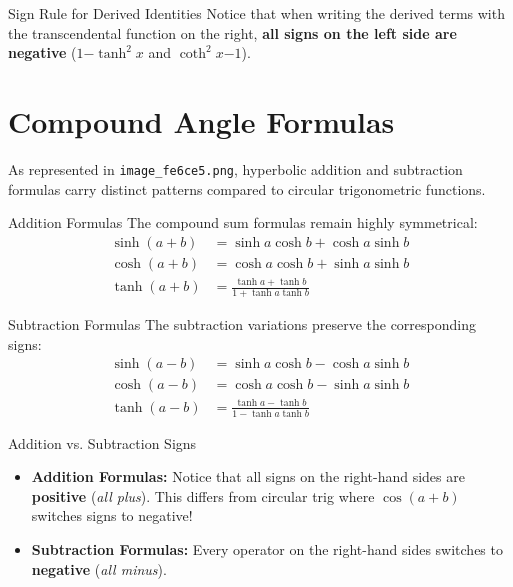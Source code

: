 \documentclass[11pt, a4paper]{article}
\begin{document}
\begin{memtip}{Sign Rule for Derived Identities}
Notice that when writing the derived terms with the transcendental function on the right, \textbf{all signs on the left side are negative} ($1 \mathbf{-} \tanh^2 x$ and $\coth^2 x \mathbf{-} 1$).
\end{memtip}

\newpage

\section{Compound Angle Formulas}
\label{sec:compound_angles}
As represented in \texttt{image\_fe6ce5.png}, hyperbolic addition and subtraction formulas carry distinct patterns compared to circular trigonometric functions.

\begin{keyconcept}{Addition Formulas}
The compound sum formulas remain highly symmetrical:
\begin{align*}
    \sinh(a + b) &= \sinh a \cosh b + \cosh a \sinh b \\
    \cosh(a + b) &= \cosh a \cosh b + \sinh a \sinh b \\
    \tanh(a + b) &= \frac{\tanh a + \tanh b}{1 + \tanh a \tanh b}
\end{align*}
\end{keyconcept}

\begin{keyconcept}{Subtraction Formulas}
The subtraction variations preserve the corresponding signs:
\begin{align*}
    \sinh(a - b) &= \sinh a \cosh b - \cosh a \sinh b \\
    \cosh(a - b) &= \cosh a \cosh b - \sinh a \sinh b \\
    \tanh(a - b) &= \frac{\tanh a - \tanh b}{1 - \tanh a \tanh b}
\end{align*}
\end{keyconcept}

\begin{memtip}{Addition vs. Subtraction Signs}
\begin{itemize}
    \item \textbf{Addition Formulas:} Notice that all signs on the right-hand sides are \textbf{positive} (\textit{all plus}). This differs from circular trig where $\cos(a+b)$ switches signs to negative!
    \item \textbf{Subtraction Formulas:} Every operator on the right-hand sides switches to \textbf{negative} (\textit{all minus}).
\end{itemize}
\end{memtip}
\end{document}
